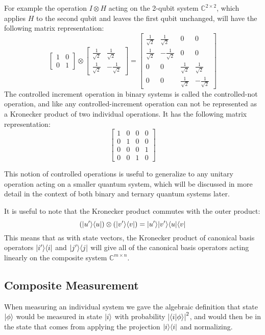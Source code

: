 For example the operation $I \otimes H$ acting on the 2-qubit system $\mathbb{C}^{2\times 2}$, which applies $H$ to the second qubit and leaves the first qubit unchanged, will have the following matrix representation:
\[
\left[\begin{matrix}
1&0\\
0&1
\end{matrix}\right]
\otimes
\left[\begin{matrix}
\frac{1}{\sqrt{2}}&\frac{1}{\sqrt{2}}\\
\frac{1}{\sqrt{2}}&-\frac{1}{\sqrt{2}}
\end{matrix}\right]
=
\left[\begin{matrix}
\frac{1}{\sqrt{2}}&\frac{1}{\sqrt{2}}&0&0\\
\frac{1}{\sqrt{2}}&-\frac{1}{\sqrt{2}}&0&0\\
0&0&\frac{1}{\sqrt{2}}&\frac{1}{\sqrt{2}}\\
0&0&\frac{1}{\sqrt{2}}&-\frac{1}{\sqrt{2}}
\end{matrix}\right]
\]
The controlled increment operation in binary systems is called the controlled-not operation, and like any controlled-increment operation can not be represented as a Kronecker product of two individual operations. It has the following matrix representation:
\[
\left[\begin{matrix}
1&0&0&0\\
0&1&0&0\\
0&0&0&1\\
0&0&1&0
\end{matrix}\right]
\]

This notion of controlled operations is useful to generalize to any unitary operation acting on a smaller quantum system, which will be discussed in more detail in the context of both binary and ternary quantum systems later.

It is useful to note that the Kronecker product commutes with the outer product:
\[(| u' \rangle\langle u |)\otimes(| v' \rangle\langle v |) = | u' \rangle| v' \rangle\langle u |\langle v |\]
This means that as with state vectors, the Kronecker product of canonical basis operators $| i' \rangle\langle i |$ and $| j' \rangle\langle j |$ will give all of the canonical basis operators acting linearly on the composite system $\mathbb{C}^{m \times n}$.
\subsection{Composite Measurement}
When measuring an individual system we gave the algebraic definition that state $| \phi \rangle$ would be measured in state $| i \rangle$ with probability $\left| \langle i | \phi \rangle \right|^2$, and would then be in the state that comes from applying the projection $| i \rangle\langle i |$ and normalizing.


